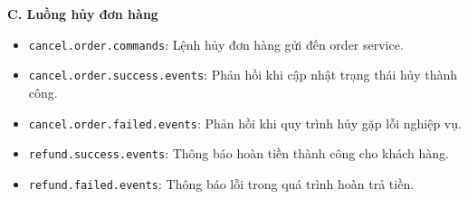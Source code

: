 \textbf{C. Luồng hủy đơn hàng}
\begin{itemize}
    \item \texttt{cancel.order.commands}: Lệnh hủy đơn hàng gửi đến order service.
    \item \texttt{cancel.order.success.events}: Phản hồi khi cập nhật trạng thái hủy thành công.
    \item \texttt{cancel.order.failed.events}: Phản hồi khi quy trình hủy gặp lỗi nghiệp vụ.
    \item \texttt{refund.success.events}: Thông báo hoàn tiền thành công cho khách hàng.
    \item \texttt{refund.failed.events}: Thông báo lỗi trong quá trình hoàn trả tiền.
\end{itemize}

